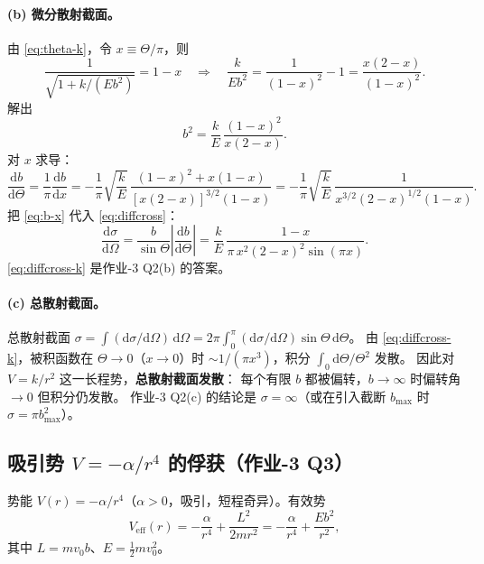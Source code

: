 \documentclass[UTF8,a4paper,11pt]{ctexart}
\begin{document}
\paragraph{(b) 微分散射截面。}
由 \eqref{eq:theta-k}，令 $x\equiv \Theta/\pi$，则
\begin{equation}
  \frac{1}{\sqrt{1+k/(Eb^2)}} = 1-x
  \quad\Longrightarrow\quad
  \frac{k}{Eb^2} = \frac{1}{(1-x)^2}-1
  = \frac{x(2-x)}{(1-x)^2}.
\end{equation}
解出
\begin{equation}
  b^2 = \frac{k}{E}\,\frac{(1-x)^2}{x(2-x)}.
  \label{eq:b-x}
\end{equation}
对 $x$ 求导：
\begin{equation}
  \frac{\mathrm db}{\mathrm d\Theta}
  = \frac{1}{\pi}\frac{\mathrm db}{\mathrm dx}
  = -\frac{1}{\pi}\sqrt{\frac{k}{E}}\,
    \frac{(1-x)^2+x(1-x)}{[x(2-x)]^{3/2}(1-x)}
  = -\frac{1}{\pi}\sqrt{\frac{k}{E}}\,
    \frac{1}{x^{3/2}(2-x)^{1/2}(1-x)}.
\end{equation}
把 \eqref{eq:b-x} 代入 \eqref{eq:diffcross}：
\begin{equation}
  \frac{\mathrm d\sigma}{\mathrm d\Omega}
  = \frac{b}{\sin\Theta}\left|\frac{\mathrm db}{\mathrm d\Theta}\right|
  = \frac{k}{E}\,\frac{1-x}{\pi\,x^2(2-x)^2\sin(\pi x)}.
  \label{eq:diffcross-k}
\end{equation}
\eqref{eq:diffcross-k} 是作业-3 Q2(b) 的答案。

\paragraph{(c) 总散射截面。}
总散射截面 $\sigma=\int(\mathrm d\sigma/\mathrm d\Omega)\,\mathrm d\Omega
=2\pi\int_0^\pi (\mathrm d\sigma/\mathrm d\Omega)\sin\Theta\,\mathrm d\Theta$。
由 \eqref{eq:diffcross-k}，被积函数在 $\Theta\to0$（$x\to0$）时
$\sim 1/(\pi x^3)$，积分 $\int_0 \mathrm d\Theta/\Theta^2$ 发散。
因此对 $V=k/r^2$ 这一长程势，\textbf{总散射截面发散}：
每个有限 $b$ 都被偏转，$b\to\infty$ 时偏转角 $\to0$ 但积分仍发散。
作业-3 Q2(c) 的结论是 $\sigma=\infty$（或在引入截断 $b_{\max}$ 时
$\sigma=\pi b_{\max}^2$）。

\subsection{吸引势 $V=-\alpha/r^4$ 的俘获（作业-3 Q3）}
\label{sub:capture}

势能 $V(r)=-\alpha/r^4$（$\alpha>0$，吸引，短程奇异）。有效势
\begin{equation}
  V_{\mathrm{eff}}(r)=-\frac{\alpha}{r^4}+\frac{L^2}{2mr^2}
  =-\frac{\alpha}{r^4}+\frac{Eb^2}{r^2},
  \label{eq:veff-capture}
\end{equation}
其中 $L=mv_0 b$、$E=\frac12 mv_0^2$。
\end{document}
